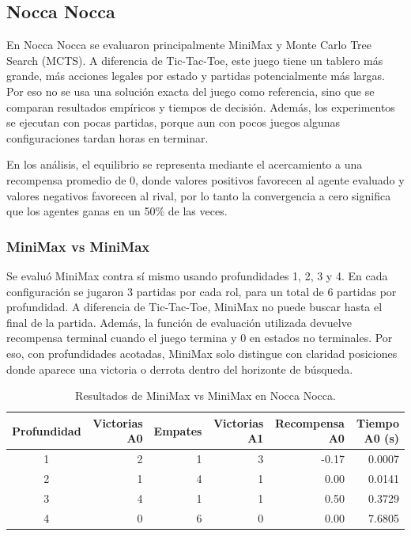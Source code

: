 \documentclass[letterpaper,12pt]{article}
\begin{document}
\subsection{Nocca Nocca}

En Nocca Nocca se evaluaron principalmente MiniMax y Monte Carlo Tree Search (MCTS). A diferencia de Tic-Tac-Toe, este juego tiene un tablero más grande, más acciones legales por estado y partidas potencialmente más largas. Por eso no se usa una solución exacta del juego como referencia, sino que se comparan resultados empíricos y tiempos de decisión. Además, los experimentos se ejecutan con pocas partidas, porque aun con pocos juegos algunas configuraciones tardan horas en terminar.

En los análisis, el equilibrio se representa mediante el acercamiento a una recompensa promedio de $0$, donde valores positivos favorecen al agente evaluado y valores negativos favorecen al rival, por lo tanto la convergencia a cero significa que los agentes ganas en un 50\% de las veces.

\subsubsection*{MiniMax vs MiniMax}

Se evaluó MiniMax contra sí mismo usando profundidades 1, 2, 3 y 4. En cada configuración se jugaron 3 partidas por cada rol, para un total de 6 partidas por profundidad. A diferencia de Tic-Tac-Toe, MiniMax no puede buscar hasta el final de la partida. Además, la función de evaluación utilizada devuelve recompensa terminal cuando el juego termina y $0$ en estados no terminales. Por eso, con profundidades acotadas, MiniMax solo distingue con claridad posiciones donde aparece una victoria o derrota dentro del horizonte de búsqueda.

\begin{table}[H]
    \centering
    \begin{tabular}{c|rrrrr}
        \toprule
        Profundidad & Victorias A0 & Empates & Victorias A1 & Recompensa A0 & Tiempo A0 (s) \\
        \midrule
        1 & 2 & 1 & 3 & -0.17 & 0.0007 \\
        2 & 1 & 4 & 1 & 0.00 & 0.0141 \\
        3 & 4 & 1 & 1 & 0.50 & 0.3729 \\
        4 & 0 & 6 & 0 & 0.00 & 7.6805 \\
        \bottomrule
    \end{tabular}
    \caption{Resultados de MiniMax vs MiniMax en Nocca Nocca.}
    \label{tab:nocca-minimax-minimax}
\end{table}
\end{document}
